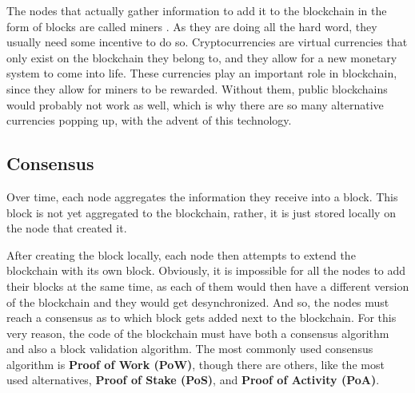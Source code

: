     
     The nodes that actually gather information to add it to the blockchain in the form of blocks are called miners . As they are doing all the hard word, they usually need some incentive to do so. Cryptocurrencies are virtual currencies that only exist on the blockchain they belong to, and they allow for a new monetary system to come into life. These currencies play an important role in blockchain, since they allow for miners to be rewarded. Without them, public blockchains would probably not work as well, which is why there are so many alternative currencies popping up, with the advent of this technology. 
    
    \subsection{Consensus}
    Over time, each node aggregates the information they receive into a block. This block is not yet aggregated to the blockchain, rather, it is just stored locally on the node that created it. 
    
    
    After creating the block locally, each node then attempts to extend the blockchain with its own block. Obviously, it is impossible for all the nodes to add their blocks at the same time, as each of them would then have a different version of the blockchain and they would get desynchronized. And so, the nodes must reach a consensus as to which block gets added next to the blockchain. For this very reason, the code of the blockchain must have both a consensus algorithm and also a block validation algorithm. The most commonly used consensus algorithm is \textbf{Proof of Work (PoW)}, though there are others, like the most used alternatives, \textbf{Proof of Stake (PoS)}, and \textbf{Proof of Activity (PoA)}. 
    
